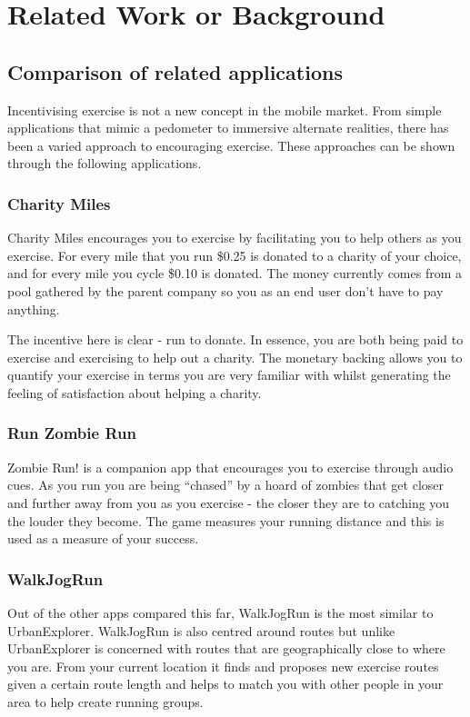 \chapter{Related Work or Background}\label{ch_background}

\section{Comparison of related applications}
Incentivising exercise is not a new concept in the mobile market. From
simple applications that mimic a pedometer to immersive alternate
realities, there has been a varied approach to encouraging
exercise. These approaches can be shown through the following
applications.


\subsection{Charity Miles}
Charity Miles encourages you to exercise by facilitating you to help
others as you exercise. For every mile that you run \$0.25 is
donated to a charity of your choice, and for every mile you cycle \$0.10
is donated. The money currently comes from a pool gathered by the
parent company so you as an end user don't have to pay anything.

The incentive here is clear - run to donate. In essence, you are both
being paid to exercise and exercising to help out a charity. The
monetary backing allows you to quantify your exercise in terms you are
very familiar with whilst generating the feeling of satisfaction about
helping a charity.

\subsection{Run Zombie Run}
Zombie Run! is a companion app that encourages you to exercise through audio cues. As you run you are being ``chased'' by a hoard of zombies that get closer and further away from you as you exercise - the closer they are to catching you the louder they become. The game measures your running distance and this is used as a measure of your success. 


\subsection{WalkJogRun}
Out of the other apps compared this far, WalkJogRun is the most similar to UrbanExplorer. WalkJogRun is also centred around routes but unlike UrbanExplorer is concerned with routes that are geographically close to where you are. From your current location it finds and proposes new exercise routes given a certain route length and helps to match you with other people in your area to help create running groups.

